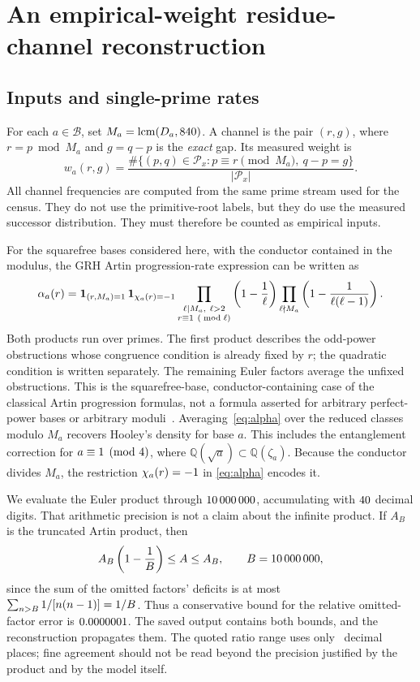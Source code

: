 \documentclass[11pt]{article}
\begin{document}
\section{An empirical-weight residue-channel reconstruction}
\subsection{Inputs and single-prime rates}
For each $a\in\mathcal B$, set $M_a=\operatorname{lcm}(D_a,840)$.
A channel is the pair $(r,g)$, where $r=p\bmod M_a$ and $g=q-p$ is the
\emph{exact} gap. Its measured weight is
\[
 w_a(r,g)=\frac{\#\{(p,q)\in\mathcal P_x:p\equiv r\pmod{M_a},\ q-p=g\}}
 {|\mathcal P_x|}.
\]
All channel frequencies are computed from the same prime stream used for the
census. They do not use the primitive-root labels, but they do use the measured
successor distribution. They must therefore be counted as empirical inputs.

For the squarefree bases considered here, with the conductor contained in the
modulus, the GRH Artin progression-rate expression can be written as
\begin{equation}
 \alpha_a(r)=\mathbf{1}_{(r,M_a)=1}\,
 \mathbf{1}_{\chi_a(r)=-1}
 \prod_{\substack{\ell\mid M_a,\ \ell>2\\r\equiv1\ (\bmod\ell)}}
 \left(1-\frac{1}{\ell}\right)
 \prod_{\ell\nmid M_a}\left(1-\frac{1}{\ell(\ell-1)}\right).
 \label{eq:alpha}
\end{equation}
Both products run over primes. The first product describes the odd-power
obstructions whose congruence condition is already fixed by $r$; the quadratic
condition is written separately. The remaining Euler factors average the
unfixed obstructions. This is the squarefree-base, conductor-containing case of
the classical Artin progression formulas, not a formula asserted for arbitrary
perfect-power bases or arbitrary moduli~\cite{moree}. Averaging~\eqref{eq:alpha} over the reduced classes modulo $M_a$ recovers
Hooley's density for base $a$. This includes the entanglement correction for
$a\equiv1\pmod{4}$, where $\mathbb Q(\sqrt a)\subset\mathbb Q(\zeta_a)$.
Because the conductor divides $M_a$, the restriction $\chi_a(r)=-1$ in
\eqref{eq:alpha} encodes it.

We evaluate the Euler product through $10\,000\,000$, accumulating with
$40$ decimal digits. That arithmetic precision is not a claim
about the infinite product. If $A_B$ is the truncated Artin product, then
\[
 A_B\left(1-\frac{1}{B}\right)\le A\le A_B,
 \qquad B=10\,000\,000,
\]
since the sum of the omitted factors' deficits is at most
$\sum_{n>B}1/[n(n-1)]=1/B$. Thus a conservative bound for the
relative omitted-factor error is $0.0000001$. The saved output contains both
bounds, and the reconstruction propagates them. The quoted ratio range uses
only \RatioDigits\ decimal places; fine agreement should not be read beyond
the precision justified by the product and by the model itself.
\end{document}
